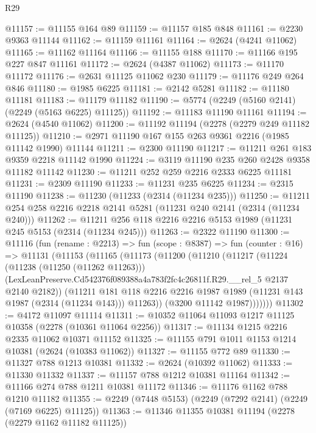 \begin{lexlean}{R29}
\begin{coremodule}
@11157 := @11155 @164 @89
@11159 := @11157 @185 @848
@11161 := @2230 @9363 @11144
@11162 := @11159 @11161
@11164 := @2624 (@4241 @11062)
@11165 := @11162 @11164
@11166 := @11155 @188
@11170 := @11166 @195 @227 @847 @11161
@11172 := @2624 (@4387 @11062)
@11173 := @11170 @11172
@11176 := @2631 @11125 @11062 @230
@11179 := @11176 @249 @264 @846
@11180 := @1985 @6225
@11181 := @2142 @5281
@11182 := @11180 @11181
@11183 := @11179 @11182
@11190 := @5774 (@2249 (@5160 @2141) (@2249 (@5163 @6225) @11125))
@11192 := @11183 @11190 @11161
@11194 := @2624 (@4540 @11062)
@11200 := @11192 @11194 (@2278 (@2279 @249 @11182 @11125))
@11210 := @2971 @11190 @167 @155 @263 @9361 @2216 (@1985 @11142 @1990) @11144
@11211 := @2300 @11190
@11217 := @11211 @261 @183 @9359 @2218 @11142 @1990
@11224 := @3119 @11190 @235 @260 @2428 @9358 @11182 @11142
@11230 := @11211 @252 @259 @2216 @2333 @6225 @11181
@11231 := @2309 @11190
@11233 := @11231 @235 @6225
@11234 := @2315 @11190
@11238 := @11230 (@11233 (@2314 (@11234 @235)))
@11250 := @11211 @254 @258 @2216 @2218 @2141 @5281 (@11231 @240 @2141 (@2314 (@11234 @240)))
@11262 := @11211 @256 @118 @2216 @2216 @5153 @1989 (@11231 @245 @5153 (@2314 (@11234 @245)))
@11263 := @2322 @11190
@11300 := @11116
    (fun (rename : @2213) =>
    fun (scope : @8387) =>
    fun (counter : @16) =>
    @11131
      (@11153
        (@11165
          (@11173
            (@11200
              (@11210
                (@11217
                  (@11224
                    (@11238 (@11250 (@11262 @11263)))
                    (LexLeanPreserve.Cd542376f089388a4a783f2fc4c26811f.R29.__rel_5
                      @2137
                      @2140
                      @2182))
                  (@11211
                    @181
                    @118
                    @2216
                    @2216
                    @1987
                    @1989
                    (@11231 @143 @1987 (@2314 (@11234 @143)))
                    @11263))
                (@3200 @11142 @1987)))))))
@11302 := @4172 @11097 @11114
@11311 := @10352 @11064 @11093 @1217 @11125 @10358 (@2278 (@10361 @11064 @2256))
@11317 := @11134 @1215 @2216 @2335 @11062 @10371 @11152
@11325 := @11155 @791 @1011 @1153 @1214 @10381 (@2624 (@10383 @11062))
@11327 := @11155 @772 @89
@11330 := @11327 @788 @1213 @10381
@11332 := @2624 (@10392 @11062)
@11333 := @11330 @11332
@11337 := @11157 @788 @1212 @10381 @11164
@11342 := @11166 @274 @788 @1211 @10381 @11172
@11346 := @11176 @1162 @788 @1210 @11182
@11355 := @2249 (@7448 @5153) (@2249 (@7292 @2141) (@2249 (@7169 @6225) @11125))
@11363 := @11346 @11355 @10381 @11194 (@2278 (@2279 @1162 @11182 @11125))

\end{coremodule}
\end{lexlean}
